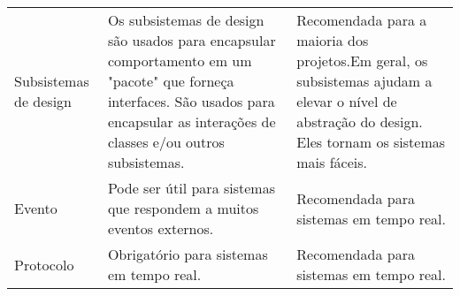 \begin{table}[]
\begin{tabular}{lll}
Subsistemas de design                              & Os subsistemas de design são usados para encapsular comportamento em um "pacote" que forneça interfaces. São usados para encapsular as interações de classes e/ou outros subsistemas.                                                                                                                                                                                                                             & Recomendada para a maioria dos projetos.Em geral, os subsistemas ajudam a elevar o nível de abstração do design. Eles tornam os sistemas mais fáceis.                                                                                                                                                                                                                            \\
Evento                                             & Pode ser útil para sistemas que respondem a muitos eventos externos.                                                                                                                                                                                                                                                                                                                                              & Recomendada para sistemas em tempo real.                                                                                                                                                                                                                                                                                                                                         \\
Protocolo                                          & Obrigatório para sistemas em tempo real.                                                                                                                                                                                                                                                                                                                                                                          & Recomendada para sistemas em tempo real.                                                                                                                                                                                                                                                                                                                                         \\

\end{tabular}
\end{table}
